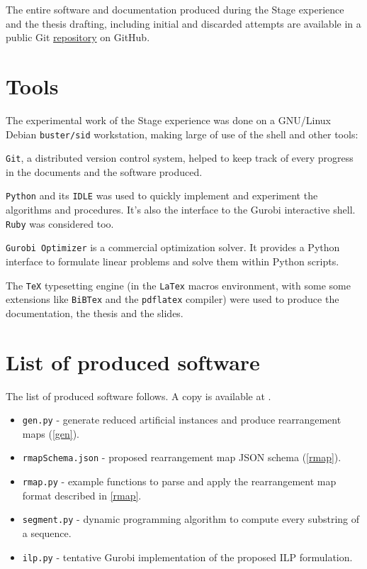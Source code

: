 The entire software and documentation produced during the Stage experience and the thesis drafting, including initial and discarded attempts are available in a public Git \href{https://github.com/avivace/dna-recombination}{repository} \cite{avivace_repo} on GitHub.

\section{Tools}
The experimental work of the Stage experience was done on a GNU/Linux Debian \texttt{buster/sid} workstation, making large of use of the shell and other tools:

\texttt{Git}, a distributed version control system, helped to keep track of every progress in the documents and the software produced.

\texttt{Python} \cite{Rossum:1995:PRM:869369} and its \texttt{IDLE} was used to quickly implement and experiment the algorithms and procedures. It's also the interface to the Gurobi interactive shell. \texttt{Ruby} was considered too.

\texttt{Gurobi Optimizer} \cite{gurobi} is a commercial optimization solver. It provides a Python interface to formulate linear problems and solve them within Python scripts.

The \texttt{TeX} typesetting engine (in the \texttt{LaTex} macros environment, with some some extensions like \texttt{BiBTex} and the \texttt{pdflatex} compiler) were used to produce the documentation, the thesis and the slides.

\section{List of produced software}
The list of produced software follows. A copy is available at \cite{avivace_repo}.
\begin{itemize}
	\item \texttt{gen.py} - generate reduced artificial instances and produce rearrangement maps (\ref{gen}).
	\item \texttt{rmapSchema.json} - proposed rearrangement map JSON schema (\ref{rmap}).
	\item \texttt{rmap.py} - example functions to parse and apply the rearrangement map format described in \ref{rmap}.
	\item \texttt{segment.py} - dynamic programming algorithm to compute every substring of a sequence.
	\item \texttt{ilp.py} - tentative Gurobi implementation of the proposed ILP formulation.
\end{itemize}

